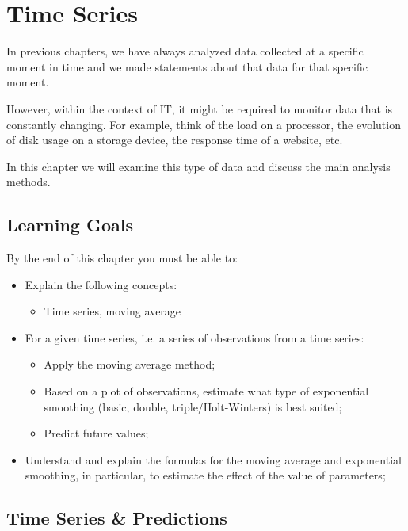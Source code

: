 \chapter{Time Series}
\label{ch:time-series}

In previous chapters, we have always analyzed data collected at a specific moment in time and we made statements about that data for that specific moment.

However, within the context of IT, it might be required to monitor data that is constantly changing. For example, think of the load on a processor, the evolution of disk usage on a storage device, the response time of a website, etc.

In this chapter we will examine this type of data and discuss the main analysis methods.

\section{Learning Goals}
\label{sec:time-series-learning-goals}

By the end of this chapter you must be able to:

\begin{itemize}
  \item Explain the following concepts:
  \begin{itemize}
    \item Time series, moving average
  \end{itemize}
  \item For a given time series, i.e. a series of observations from a time series:
  \begin{itemize}
    \item Apply the moving average method;
    \item Based on a plot of observations, estimate what type of exponential smoothing (basic, double, triple/Holt-Winters) is best suited;
    \item Predict future values;
  \end{itemize}
  \item Understand and explain the formulas for the moving average and exponential smoothing, in particular, to estimate the effect of the value of parameters; 
\end{itemize}

  \section{Time Series \& Predictions}

